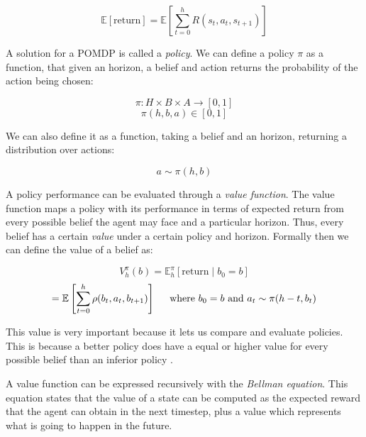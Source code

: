 \begin{equation}
 \mathbb{E}[\text{return}] = \mathbb{E} \left [ \sum_{t=0}^{h} R(s_t, a_t, s_{t+1}) \right ]
\end{equation}

A solution for a POMDP is called a \textit{policy}. We can define a policy $\pi$ as a function, that
given an horizon, a belief and action returns the probability of the action being chosen:

\begin{equation}
 \pi : H \times B \times A \rightarrow [0,1]
\end{equation}
\begin{equation}
 \pi(h, b, a) \in [0,1]
\end{equation}

We can also define it as a function, taking a belief and an horizon, returning a distribution over
actions:

\begin{equation}
 a \sim \pi(h, b)
\end{equation}

A policy performance can be evaluated through a \textit{value function}. The value function maps a
policy with its performance in terms of expected return from every possible belief the agent may
face and a particular horizon. Thus, every belief has a certain \textit{value} under a certain
policy and horizon. Formally then we can define the value of a belief as:

\begin{equation}
 V^\pi_{h}(b) = \mathbb{E}^\pi_h \left [\text{return} \mid b_0 = b \right ]
\end{equation}
\begin{equation}
 = \mathbb{E} \left [\sum_{t=0}^{h} \rho(b_{t}, a_t, b_{t+1}) \right ]
    \hspace{0.5cm}\text{where }b_0 = b \text{ and }a_t \sim \pi(h-t, b_t)
\end{equation}

This value is very important because it lets us compare and evaluate policies. This is because a
better policy does have a equal or higher value for every possible belief than an inferior policy
\cite{cit:suttonbarto}.

A value function can be expressed recursively with the \textit{Bellman equation}. This equation
states that the value of a state can be computed as the expected reward that the agent can obtain in
the next timestep, plus a value which represents what is going to happen in the future.

